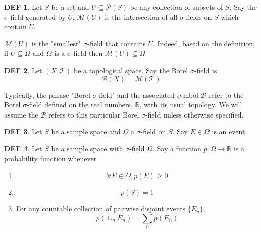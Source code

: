 \documentclass{article}
\theoremstyle{definition}\newtheorem{definition}{DEF}
\theoremstyle{definition}\newtheorem{example}{Ex}
\theoremstyle{lemma}\newtheorem{lemma}{Lemma}
\theoremstyle{corrolary}\newtheorem{corrolary}{Cor}
\begin{document}
\begin{definition}
Let $S$ be a set and $U \subseteq \mathcal{P}(S)$ be any collection of subsets of $S$.
Say the $\sigma$-field generated by $U$, $\mathscr{M}(U)$ is the intersection of all $\sigma$-fields on $S$ which contain $U$.
\end{definition}

$\mathscr{M} (U)$ is the "smallest" $\sigma$-field that contains $U$. Indeed, based on the definition, if $U \subseteq \Omega$ and $\Omega$ is a $\sigma$-field then $\mathscr{M}(U) \subseteq \Omega$.

\begin{definition}
Let $(X, \mathscr{T})$ be a topological space.
Say the Borel $\sigma$-field is 
\begin{equation}
\mathcal{B}(X) = \mathscr{M}(\mathscr{T})
\end{equation}
\end{definition}

Typically, the phrase "Borel $\sigma$-field" and the associated symbol $\mathcal{B}$ refer to the Borel $\sigma$-field defined on the real numbers, $\mathbb{R}$, with its usual topology.
We will assume the $\mathcal{B}$ refers to this particular Borel $\sigma$-field unless otherwise specified.

\begin{definition}
Let $S$ be a sample space and $\Omega$ a $\sigma$-field on $S$.
Say $E \in \Omega$ is an event.
\end{definition}

\begin{definition}
Let $S$ be a sample space with $\sigma$-field $\Omega$.
Say a function $p: \Omega \rightarrow \mathbb{R}$ is a probability function whenever
\begin{enumerate}
\item \begin{equation}
\forall E \in \Omega, p(E) \geq 0
\end{equation}
\item \begin{equation}
p(S) = 1
\end{equation}
\item For any countable collection of pairwise disjoint events $\{ E_n \}$, 
\begin{equation}
p(\cup_n E_n ) = \sum_n p(E_n )
\end{equation}
\end{enumerate}
\end{definition}
\end{document}
